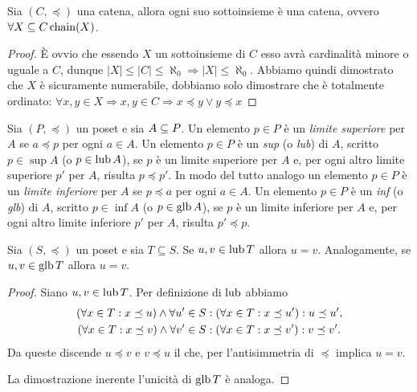 \begin{proposizione} 
Sia $(C, \preceq)$ una catena, allora ogni suo sottoinsieme è una catena, ovvero $\forall X \subseteq C \mathop{\mathrm{chain}}\nolimits(X)$.
\end{proposizione}
\begin{proof}
È ovvio che essendo $X$ un sottoinsieme di $C$ esso avrà cardinalità minore o uguale a $C$, dunque $|X| \leq |C| \leq \aleph_0 \Rightarrow |X| \leq \aleph_0$. Abbiamo quindi dimostrato che $X$ è sicuramente numerabile, dobbiamo solo dimostrare che è totalmente ordinato:
$\forall x,y \in X \Rightarrow x,y \in C \Rightarrow x \preceq y \lor y \preceq x$
\end{proof}

\begin{definizione} 
Sia $(P, \preceq)$ un poset e sia $A \subseteq P$.
Un elemento $p \in P$ \`e un \emph{limite superiore} per $A$
se $a \preceq p$ per ogni $a\in A$.
Un elemento $p \in P$ \`e un \emph{sup} (o \emph{lub}) di $A$,
scritto $p \in \sup A$ (o $p \in \mathop{\mathrm{lub}}\nolimits A$),
se $p$ \`e un limite superiore per $A$ e,
per ogni altro limite superiore $p'$ per $A$,
risulta $p \preceq p'$.
In modo del tutto analogo un elemento $p \in P$ \`e un \emph{limite inferiore}
per $A$ se $p \preceq a$ per ogni $a \in A$.
Un elemento $p \in P$ \`e un \emph{inf} (o \emph{glb}) di $A$,
scritto $p \in \inf A$ (o $p \in \mathop{\mathrm{glb}}\nolimits A$),
se $p$ \`e un limite inferiore per $A$ e,
per ogni altro limite inferiore $p'$ per $A$, risulta $p' \preceq p$.
\end{definizione}

\begin{proposizione} 
Sia $(S, \preceq)$ un poset e sia $T \subseteq S$.
Se $u, v \in \mathop{\mathrm{lub}}\nolimits T$ allora $u = v$.
Analogamente, se $u, v \in \mathop{\mathrm{glb}}\nolimits T$ allora $u = v$.
\end{proposizione}
\begin{proof}
Siano $u, v \in \mathop{\mathrm{lub}}\nolimits T$.  Per definizione di $\mathop{\mathrm{lub}}\nolimits$ abbiamo
\begin{align*}
  (\forall x \in T \mathrel{:} x \preceq u)
    \land
      \forall u' \in S
        &\mathrel{:} (\forall x \in T \mathrel{:} x \preceq u') \mathrel{:} u \preceq u', \\
  (\forall x \in T \mathrel{:} x \preceq v)
    \land
      \forall v' \in S
        &\mathrel{:} (\forall x \in T \mathrel{:} x \preceq v') \mathrel{:} v \preceq v'.
\end{align*}
Da queste discende $u \preceq v$ e $v \preceq u$ il che,
per l'antisimmetria di $\preceq$ implica $u = v$.

La dimostrazione inerente l'unicità di $\mathop{\mathrm{glb}}\nolimits T$ è analoga.
\end{proof}


